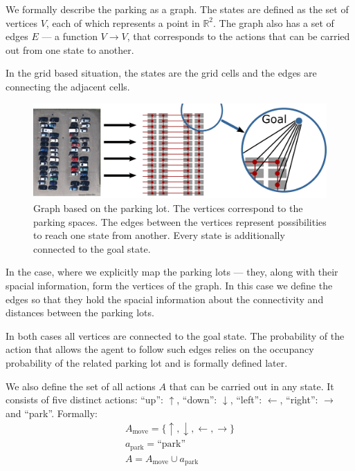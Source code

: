 We formally describe the parking as a graph. The states are defined as the set
of vertices $V$, each of which represents a point in $\mathbb{R}^2$. The graph
also has a set of edges $E$ --- a function $V \rightarrow V$, that corresponds
to the actions that can be carried out from one state to another.

In the grid based situation, the states are the grid cells and the edges are
connecting the adjacent cells.

\begin{figure}[t]
    \begin{center}
        \includegraphics[width=\textwidth]{pictures/graph.pdf}
    \end{center}
    \caption{Graph based on the parking lot. The vertices correspond to the parking spaces. The edges between the vertices represent possibilities to reach one state from another. Every state is additionally connected to the goal state.}
    \vspace{-5mm}
    \label{fig:graph}
\end{figure}

In the case, where we explicitly map the parking lots --- they, along with
their spacial information, form the vertices of the graph. In this case we
define the edges so that they hold the spacial information about the
connectivity and distances between the parking lots.

In both cases all vertices are connected to the goal state. The probability of
the action that allows the agent to follow such edges relies on the occupancy
probability of the related parking lot and is formally defined later.

We also define the set of all actions $A$ that can be carried out in any
state. It consists of five distinct actions: ``up'': $\uparrow$, ``down'':
$\downarrow$, ``left'': $\leftarrow$, ``right'': $\rightarrow$ and ``park''.
Formally:
\begin{eqnarray}
A_{\mathrm{move}} = \{ \uparrow, \downarrow, \leftarrow, \rightarrow \} \\
a_{\mathrm{park}} = \mbox{``park''} \\
A = A_{\mathrm{move}} \cup a_{\mathrm{park}}
\label{eq:actions}
\end{eqnarray}

